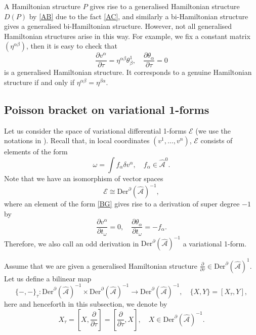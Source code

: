 \documentclass[11pt,a4paper]{amsart}
\numberwithin{equation}{section}
\newcommand{\derx}{\mathrm{Der}^{\qp}(\hm A)}
\newcommand{\diff}[2]{\frac{\partial #1}{\partial #2}}
\newcommand{\qa}{\alpha}
\newcommand{\qb}{\beta}
\newcommand{\qd}{\delta}
\newcommand{\qt}{\tau}
\newcommand{\qth}{\theta}
\newcommand{\qp}{\partial}
\newcommand{\qo}{\omega}
\newcommand{\hm}[1]{\hat{\mathcal #1}}
\newcommand{\fk}[2]{\left[#1, #2\right]}
\numberwithin{equation}{section}
\begin{document}
A Hamiltonian structure $P$ gives rise to a generalised Hamiltonian structure $D(P)$ by \eqref{AB} due to the fact \eqref{AC}, and similarly a bi-Hamiltonian structure gives a generalised bi-Hamiltonian structure. However, not all generalised Hamiltonian structures arise in this way. For example, we fix a constant matrix $(\eta^{\qa\qb})$, then it is easy to check that 
\[
\diff{v^\qa}{\qt} = \eta^{\qa\qb}\qth_\qb^1,\quad \diff{\qth_\qa}{\qt} = 0
\] 
is a generalised Hamiltonian structure. It corresponds to a genuine Hamiltonian structure if and only if $\eta^{\qa\qb} = \eta^{\qb\qa}$.

\subsection{Poisson bracket on variational 1-forms}
Let us consider the space of variational differential 1-forms $\mathcal E$ (we use the notations in \cite{LWZ2}). Recall that, in local coordinates $(v^1,\dots,v^n)$, $\mathcal E$ consists of elements of the form
\begin{equation}
    \label{BG}
\qo = \int f_\qa\qd v^\qa,\quad f_\qa\in\hm A^0.
\end{equation}
Note that we have an isomorphism of vector spaces
\[
\mathcal E\cong\derx^{-1},
\]
where an element of the form \eqref{BG} gives rise to a derivation of super degree $-1$ by 
\[
\diff{v^\qa}{t_\qo} = 0,\quad \diff{\qth_\qa}{t_\qo} = -f_\qa.
\]
Therefore, we also call an odd derivation in $\derx^{-1}$ a variational 1-form.

Assume that we are given a generalised Hamiltonian structure $\diff{}{\qt}\in\derx^1$. Let us define a bilinear map 
\begin{equation}
    \label{BH}
    \{-,-\}_\qt\colon \derx^{-1}\times \derx^{-1}\to \derx^{-1},\quad \{X,Y\} = [X_\qt,Y],
\end{equation}
here and henceforth in this subsection, we denote by 
\[
X_\qt = \fk{X}{\diff{}{\qt}} =\fk{\diff{}{\qt}}{X},\quad X\in\derx^{-1}. 
\]
\end{document}
